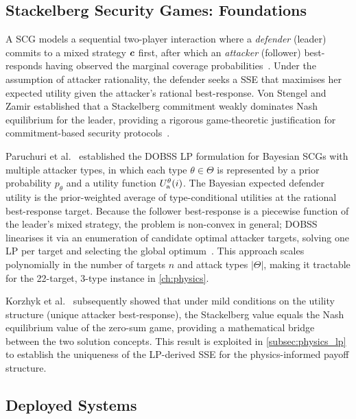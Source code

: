 \subsection{Stackelberg Security Games: Foundations}
\label{subsec:lit_ssg}

A \acf{SCG} models a sequential two-player interaction where a
\emph{defender} (leader) commits to a mixed strategy $\bm{c}$ first,
after which an \emph{attacker} (follower) best-responds having observed
the marginal coverage probabilities~\cite{Conitzer2006}.  Under the
assumption of attacker rationality, the defender seeks a
\acf{SSE} that maximises her expected utility given the attacker's
rational best-response.  Von Stengel and Zamir established that a
Stackelberg commitment weakly dominates Nash equilibrium for the leader,
providing a rigorous game-theoretic justification for
commitment-based security protocols~\cite{Conitzer2006}.

Paruchuri et al.~\cite{Paruchuri2008} established the
\textsc{DOBSS} LP formulation for Bayesian \acp{SCG} with multiple
attacker types, in which each type $\theta \in \Theta$ is represented
by a prior probability $p_\theta$ and a utility function $U_{\mathrm{a}}^\theta(i)$.
The Bayesian expected defender utility is the prior-weighted average of
type-conditional utilities at the rational best-response target.
Because the follower best-response is a piecewise function of the
leader's mixed strategy, the problem is non-convex in general;
\textsc{DOBSS} linearises it via an enumeration of candidate optimal
attacker targets, solving one LP per target and selecting the global
optimum~\cite{Paruchuri2008}.  This approach scales polynomially in the
number of targets $n$ and attack types $|\Theta|$, making it tractable
for the 22-target, 3-type instance in \cref{ch:physics}.

Korzhyk et al.~\cite{Korzhyk2011} subsequently showed that under mild
conditions on the utility structure (unique attacker best-response), the
Stackelberg value equals the Nash equilibrium value of the zero-sum
game, providing a mathematical bridge between the two solution concepts.
This result is exploited in \cref{subsec:physics_lp} to establish the
uniqueness of the LP-derived SSE for the physics-informed payoff structure.

\subsection{Deployed Systems}
\label{subsec:lit_deployed}

